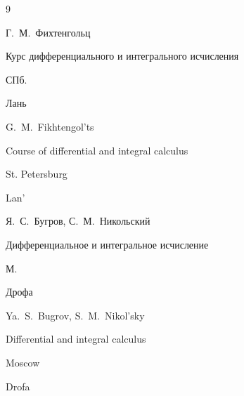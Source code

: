 \begin{thebibliography}{9}




\by Г.~М.~Фихтенгольц

\book Курс дифференциального и интегрального исчисления


\publaddr СПб.

\publ Лань



\misctransl

\by G.~M.~Fikhtengol'ts 

\book Course of differential and integral calculus


\publaddr St. Petersburg

\publ Lan'






\by Я.~С.~Бугров, С.~М.~Никольский

\book Дифференциальное и интегральное исчисление


\publaddr М.

\publ Дрофа



\misctransl 

\by Ya.~S.~Bugrov, S.~M.~Nikol'sky

\book Differential and integral calculus


\publaddr Moscow

\publ Drofa





\end{thebibliography}



\noindent

\hskip6.5cm \thedate \par\noindent

\hskip6.5cm\therevdate





